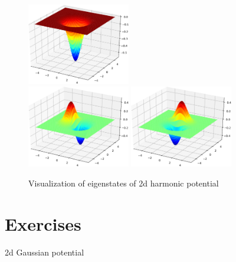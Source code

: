 \begin{figure}[h]
{\centering
\includegraphics[width=0.4\textwidth]{../codes/sch_2d/IMG_harmonic_psi_1.pdf}\\
\includegraphics[width=0.4\textwidth]{../codes/sch_2d/IMG_harmonic_psi_2.pdf}%
\includegraphics[width=0.4\textwidth]{../codes/sch_2d/IMG_harmonic_psi_3.pdf}
\par}
\caption{Visualization of eigenstates of 2d harmonic potential}
\label{fig:harm_2d_eigenfunctions}
\end{figure}

\section{Exercises}

2d Gaussian potential